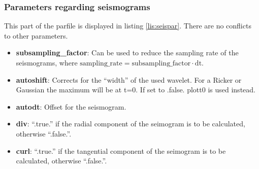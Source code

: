 		\subsubsection{Parameters regarding seismograms}
			This part of the parfile is displayed in listing \ref{lis:seispar}. There are no conflicts to other parameters.
			 
    		\begin{itemize}
    			\item \textbf{subsampling\_factor}: Can be used to reduce the sampling rate of the seismograms, where $\mathrm{sampling\_rate}=\mathrm{subsampling\_factor} \cdot \mathrm{dt}$.
    			\item \textbf{autoshift}: Corrects for the ``width'' of the used wavelet. For a Ricker or Gaussian the maximum will be at t=0. If set to .false. plott0 is used instead.
    			\item \textbf{autodt}: Offset for the seismogram.
    			\item \textbf{div}: ``.true.'' if the radial component of the seimogram is to be calculated, otherwise ``.false.''.
    			\item \textbf{curl}: ``.true.'' if the tangential component of the seimogram is to be calculated, otherwise ``.false.''.
    		\end{itemize}

